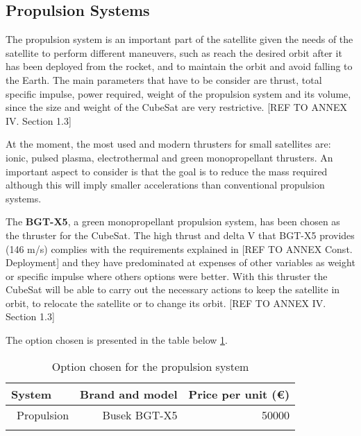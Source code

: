 \subsection{Propulsion Systems}
The propulsion system is an important part of the satellite given the needs of the satellite to perform different maneuvers, such as reach the desired orbit after it has been deployed from the rocket, and to maintain the orbit and avoid falling to the Earth. The main parameters that have to be consider are thrust, total specific impulse, power required, weight of the propulsion system and its volume, since the size and weight of the CubeSat are very restrictive. [{REF TO ANNEX IV. Section 1.3}]

At the moment, the most used and modern thrusters for small satellites are: ionic, pulsed plasma, electrothermal and green monopropellant thrusters. An important aspect to consider is that the goal is to reduce the mass required although this will imply smaller accelerations than conventional propulsion systems.

The \textbf{BGT-X5}, a green monopropellant propulsion system, has been chosen as the thruster for the CubeSat. The high thrust and delta V that BGT-X5 provides (146 m/s) complies with the requirements explained in [{REF TO ANNEX Const. Deployment}] and they have predominated at expenses of other variables as weight or specific impulse where others options were better. With this thruster the CubeSat will be able to carry out the necessary actions to keep the satellite in orbit, to relocate the satellite or to change its orbit. [{REF TO ANNEX IV. Section 1.3}]

The option chosen is presented in the table below \ref{propulsionfinal}.

\begin{longtable}{| l | r | r | }
\hline
\rowcolor[gray]{0.80}	\textbf{System} &  \textbf{Brand and model}     & \textbf{Price per unit (\euro)}   \\
\hline
\endfirsthead

	   ~Propulsion & Busek BGT-X5 & 50000 \\
	\hline

\caption{Option chosen for the propulsion system}
\label{propulsionfinal}
\end{longtable}